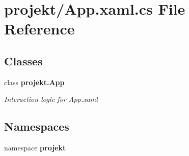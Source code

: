 \section{projekt/\+App.xaml.\+cs File Reference}
\label{App_8xaml_8cs}
\subsection*{Classes}
\begin{DoxyCompactItemize}
\item 
class \textbf{ projekt.\+App}
\begin{DoxyCompactList}\small\item\em Interaction logic for App.\+xaml \end{DoxyCompactList}\end{DoxyCompactItemize}
\subsection*{Namespaces}
\begin{DoxyCompactItemize}
\item 
namespace \textbf{ projekt}
\end{DoxyCompactItemize}
